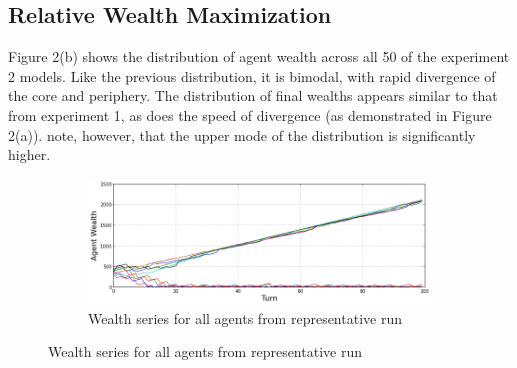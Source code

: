 \documentclass{article}
\begin{document}
\subsection{Relative Wealth Maximization}

Figure 2(b) shows the distribution of agent wealth across all 50 of the experiment 2 models. Like the previous distribution, it is bimodal, with rapid divergence of the core and periphery.  The distribution of final wealths appears similar to that from experiment 1, as does the speed of divergence (as demonstrated in Figure 2(a)). note, however, that the upper mode of the distribution is significantly higher. 

\begin{figure}[h!]
	\centering
	\begin{subfigure}{\textwidth}
		\includegraphics[width=\textwidth]{Graphics/Exp2SampleRun}
		\caption{Wealth series for all agents from representative run}
	\end{subfigure}



\end{figure}
\end{document}
